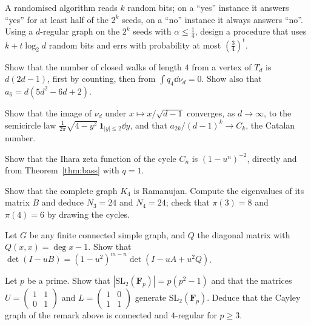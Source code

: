 \begin{exercise}[$\star\star$]\label{ex:amplify}
A randomised algorithm reads $k$ random bits; on a ``yes'' instance it answers ``yes'' for at least half of the $2^k$ seeds, on a ``no'' instance it always answers ``no''. Using a $d$-regular graph on the $2^k$ seeds with
$\alpha\le\frac14$, design a procedure that uses $k+t\log_2d$ random bits and errs with probability at most $(\frac34)^t$.
\end{exercise}

\begin{exercise}[$\star$]\label{ex:treemoments}
Show that the number of closed walks of length $4$ from a vertex of $T_d$ is $d(2d-1)$, first by counting, then from $\int q_4\dd\nu_d=0$. Show also that $a_6=d(5d^2-6d+2)$.
\end{exercise}

\begin{exercise}[$\star\star$]\label{ex:kmsemicircle}
Show that the image of $\nu_d$ under $x\mapsto x/\sqrt{d-1}$ converges, as $d\to\infty$, to the semicircle law $\frac1{2\pi}\sqrt{4-y^2}\,\mathbf 1_{|y|\le2}\dd y$, and that $a_{2k}/(d-1)^k\to C_k$, the Catalan number.
\end{exercise}

\begin{exercise}[$\star$]\label{ex:cycleihara}
Show that the Ihara zeta function of the cycle $C_n$ is $(1-u^n)^{-2}$, directly and from Theorem~\ref{thm:bass} with $q=1$.
\end{exercise}

\begin{exercise}[$\star\star$]\label{ex:k4}
Show that the complete graph $K_4$ is Ramanujan. Compute the eigenvalues of its matrix $B$ and deduce $N_3=24$ and $N_4=24$; check that $\pi(3)=8$ and $\pi(4)=6$ by drawing the cycles.
\end{exercise}

\begin{exercise}[$\star\star$]\label{ex:irregularbass}
Let $G$ be any finite connected simple graph, and $Q$ the diagonal matrix with $Q(x,x)=\deg x-1$. Show that $\det(I-uB)=(1-u^2)^{m-n}\det(I-uA+u^2Q)$.
\end{exercise}

\begin{exercise}[$\star\star$]\label{ex:sl2gen}
Let $p$ be a prime. Show that $|\mathrm{SL}_2(\mathbf F_p)|=p(p^2-1)$ and that the matrices $U=(\begin{smallmatrix}1&1\\0&1\end{smallmatrix})$ and $L=(\begin{smallmatrix}1&0\\1&1\end{smallmatrix})$ generate $\mathrm{SL}_2(\mathbf F_p)$. Deduce that the Cayley
graph of the remark above is connected and $4$-regular for $p\ge3$.
\end{exercise}

